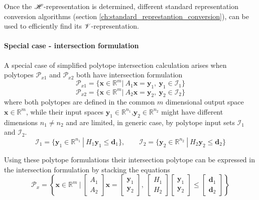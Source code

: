 Once the $\mathscr{H}$-representation is determined, different standard representation conversion algorithms (section \ref{ch:standard_represtantion_conversion}), can be used to efficiently find its $\mathscr{V}$-representation.

\paragraph*{Special case - intersection formulation}

A special case of simplified polytope intersection calculation arises when polytopes $\mathcal{P}_{x1}$ and $\mathcal{P}_{x2}$ both have intersection formulation
\begin{equation}
    \mathcal{P}_{x1}=\{\bm{x}\in\mathbb{R}^m |~ A_1\bm{x} = \bm{y}_1,~\bm{y}_1 \in \mathcal{I}_1  \}
\end{equation}
\begin{equation}
    \mathcal{P}_{x2}=\{\bm{x}\in\mathbb{R}^m |~ A_2\bm{x} = \bm{y}_2,~\bm{y}_2 \in \mathcal{I}_2  \}
\end{equation}
where both polytopes are defined in the common $m$ dimensional output space $\bm{x}\in\mathbb{R}^m$, while their input spaces $\bm{y}_1\in\mathbb{R}^{n_1}$,$\bm{y}_2\in\mathbb{R}^{n_2}$ might have different dimensions $n_1\neq n_2$ and are limited, in generic case, by polytope input sets $\mathcal{I}_1$ and $\mathcal{I}_2$.
\begin{equation}
    \mathcal{I}_{1}=\{\bm{y}_1\in\mathbb{R}^{n_1} ~|~ H_1\bm{y}_1 \leq \bm{d}_1\}, \qquad
    \mathcal{I}_{2}=\{\bm{y}_2\in\mathbb{R}^{n_2} ~|~ H_2\bm{y}_2 \leq \bm{d}_2\}
\end{equation}

Using these polytope formulations their intersection polytope can be expressed in the intersection formulation by stacking the equations
\begin{equation}
    \mathcal{P}_{x}=\left\{\bm{x}\in\mathbb{R}^m ~\bigg|~ 
   \begin{bmatrix}
        A_1 \\
        A_2
    \end{bmatrix} \bm{x} = \begin{bmatrix}
        \bm{y}_1 \\
        \bm{y}_2
    \end{bmatrix}, ~\begin{bmatrix}
        H_1  \\
        H_2
    \end{bmatrix} \begin{bmatrix}
        \bm{y}_1 \\
        \bm{y}_2
    \end{bmatrix} \leq \begin{bmatrix}
        \bm{d}_1  \\
        \bm{d}_2
    \end{bmatrix} \right\}
\end{equation}


